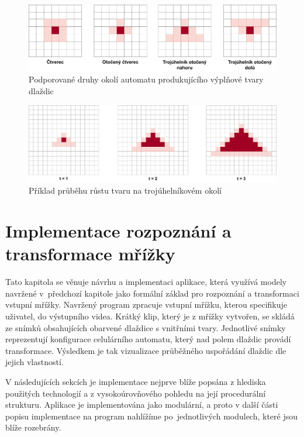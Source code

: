 \begin{figure}[H]
    \centering
    \includegraphics[width=\textwidth]{obrazky-figures/VnitrniTvar.pdf}
    \caption{Podporované druhy okolí automatu produkujícího výplňové tvary dlaždic}
    \label{fig:VnitrniTvar}
\end{figure}

\begin{figure}[H]
    \centering
    \includegraphics[width=\textwidth]{obrazky-figures/RustTvaru.pdf}
    \caption{Příklad průběhu růstu tvaru na trojúhelníkovém okolí}
    \label{fig:RustTvaru}
\end{figure}

\chapter{Implementace rozpoznání a transformace mřížky} 
\label{impl}

Tato kapitola se věnuje návrhu a implementaci aplikace, která využívá modely navržené v~předchozí kapitole jako formální základ pro rozpoznání a transformaci vstupní mřížky. Navržený program zpracuje vstupní mřížku, kterou specifikuje uživatel, do výstupního videa. Krátký klip, který je z mřížky vytvořen, se skládá ze snímků obsahujících obarvené dlaždice s vnitřními tvary. Jednotlivé snímky reprezentují konfigurace celulárního automatu, který nad polem dlaždic provádí transformace. Výsledkem je tak vizualizace průběžného uspořádání dlaždic dle jejich vlastností. 

V následujících sekcích je implementace nejprve blíže popsána z hlediska použitých technologií a z vysokoúrovňového pohledu na její procedurální strukturu. Aplikace je implementována jako modulární, a proto v další části popisu implementace na program nahlížíme po~jednotlivých modulech, které jsou blíže rozebrány.
